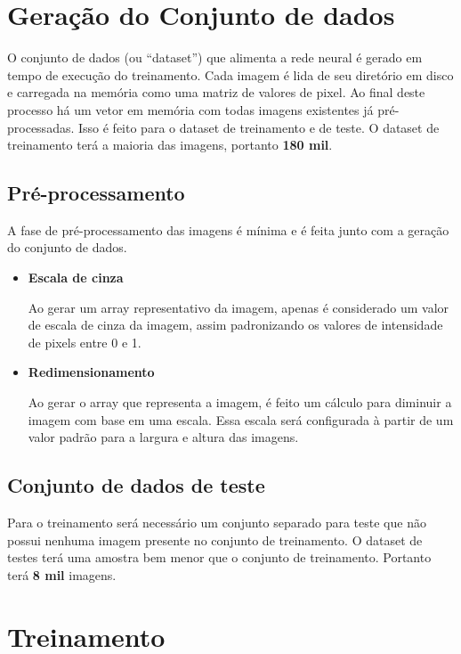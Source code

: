 \section{Geração do Conjunto de dados}

O conjunto de dados (ou ``dataset'') que alimenta a rede neural é
gerado em tempo de execução do treinamento. Cada imagem é lida de seu
diretório em disco e carregada na memória como uma matriz de valores
de pixel. Ao final deste processo há um vetor em memória com todas
imagens existentes já pré-processadas. Isso é feito para o dataset de
treinamento e de teste. O dataset de treinamento terá a maioria das
imagens, portanto {\bf 180 mil}.

\subsection{Pré-processamento}

A fase de pré-processamento das imagens é mínima e é feita junto com a
geração do conjunto de dados.

\begin{itemize}
\item{\bf Escala de cinza}

Ao gerar um array representativo da imagem, apenas é considerado um
valor de escala de cinza da imagem, assim padronizando os valores de
intensidade de pixels entre 0 e 1.

\item{\bf Redimensionamento}

Ao gerar o array que representa a imagem, é feito um cálculo para
diminuir a imagem com base em uma escala. Essa escala será configurada
à partir de um valor padrão para a largura e altura das imagens.

\end{itemize}

\subsection{Conjunto de dados de teste}

Para o treinamento será necessário um conjunto separado para teste que
não possui nenhuma imagem presente no conjunto de treinamento.
O dataset de testes terá uma amostra bem menor que o conjunto de
treinamento. Portanto terá {\bf 8 mil} imagens.

\section{Treinamento}

